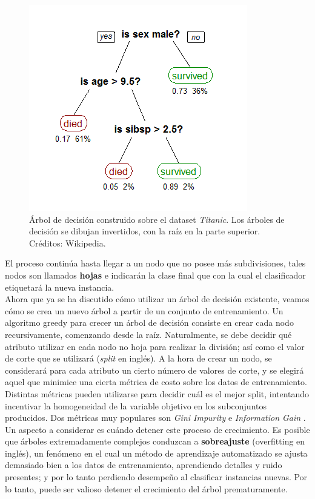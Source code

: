 \begin{figure}[h!]
\begin{center}
\includegraphics[width=.44\textwidth]{Kap1/tree.png}
\end{center}
\caption[short]{Árbol de decisión construido sobre el dataset \textit{Titanic}. Los árboles de decisión se dibujan invertidos, con la raíz en la parte superior. Créditos: Wikipedia. }
\label{fig:tree}
\end{figure}

El proceso continúa hasta llegar a un nodo que no posee más subdivisiones, tales nodos son llamados \textbf{hojas} e indicarán la clase final que con la cual el clasificador etiquetará la nueva instancia. \\

Ahora que ya se ha discutido cómo utilizar un árbol de decisión existente, veamos cómo se crea un nuevo árbol a partir de un conjunto de entrenamiento. Un algoritmo greedy para crecer un árbol de decisión consiste en crear cada nodo recursivamente, comenzando desde la raíz. Naturalmente, se debe decidir qué atributo utilizar en cada nodo no hoja para realizar la división; así como el valor de corte que se utilizará (\textit{split} en inglés). A la hora de crear un nodo, se considerará para cada atributo un cierto número de valores de corte, y se elegirá aquel que minimice una cierta métrica de costo sobre los datos de entrenamiento. \\

Distintas métricas pueden utilizarse para decidir cuál es el mejor split, intentando incentivar la homogeneidad de la variable objetivo en los subconjuntos producidos. Dos métricas muy populares son \textit{Gini Impurity} e \textit{Information Gain} \cite{ginigain}.\\

Un aspecto a considerar es cuándo detener este proceso de crecimiento. Es posible que árboles extremadamente complejos conduzcan a \textbf{sobreajuste} (overfitting en inglés), un fenómeno en el cual un método de aprendizaje automatizado se ajusta demasiado bien a los datos de entrenamiento, aprendiendo detalles y ruido presentes; y por lo tanto perdiendo desempeño al clasificar instancias nuevas. Por lo tanto, puede ser valioso detener el crecimiento del árbol prematuramente.%


